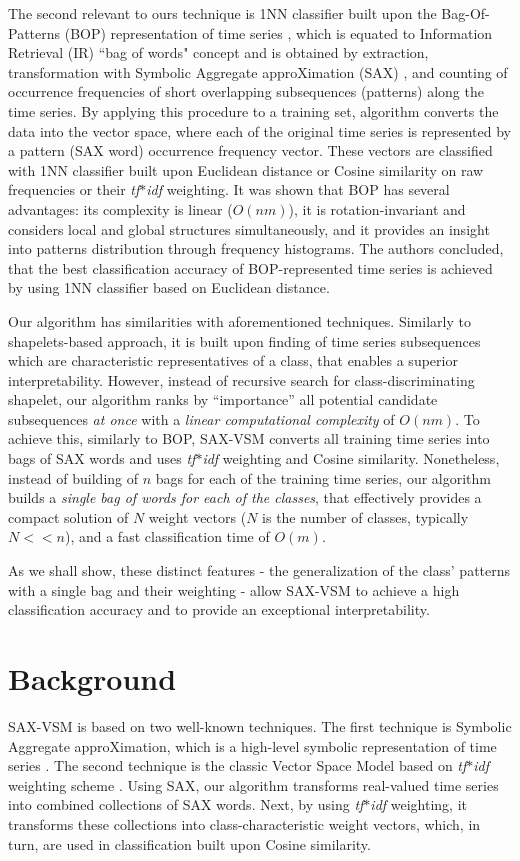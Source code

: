 \documentclass[conference]{IEEEtran}
\begin{document}
The second relevant to ours technique is 1NN classifier built upon the 
Bag-Of-Patterns (BOP) representation of time series \cite{bag_patterns}, 
which is equated to Information Retrieval (IR) ``bag of words" concept 
and is obtained by extraction, transformation with Symbolic Aggregate 
approXimation (SAX) \cite{sax}, and counting of occurrence frequencies
of short overlapping subsequences (patterns) along the time series.
By applying this procedure to a training set, algorithm converts the data into 
the vector space, where each of the original time series is represented by a 
pattern (SAX word) occurrence frequency vector. 
These vectors are classified with 1NN classifier built upon Euclidean distance 
or Cosine similarity on raw frequencies or their \textit{tf$\ast$idf} weighting. 
It was shown that BOP has several advantages: its complexity is linear 
($O(nm)$), it is rotation-invariant and considers local and global structures 
simultaneously, and it provides an insight into patterns distribution through 
frequency histograms.
The authors concluded, that the best classification accuracy of BOP-represented 
time series is achieved by using 1NN classifier based on Euclidean distance.

Our algorithm has similarities with aforementioned techniques. 
Similarly to shapelets-based approach, it is built upon finding of 
time series subsequences which are characteristic representatives 
of a class, that enables a superior interpretability.
However, instead of recursive search for class-discriminating shapelet, 
our algorithm ranks by “importance” all potential candidate subsequences 
\textit{at once} with a \textit{linear computational complexity} of $O(nm)$.
To achieve this, similarly to BOP, \mbox{SAX-VSM} converts all training 
time series into bags of SAX words and uses \textit{tf$\ast$idf} 
weighting and Cosine similarity.
Nonetheless, instead of building of $n$ bags for each of the training time series, 
our algorithm builds a \textit{single bag of words for each of the classes}, 
that effectively provides a compact solution of $N$ weight vectors 
($N$ is the number of classes, typically $N<<n$), and a fast classification time 
of $O(m)$.

As we shall show, these distinct features - the generalization of the class' 
patterns with a single bag and their weighting - allow SAX-VSM to achieve a 
high classification accuracy and to provide an exceptional interpretability.

\section{Background} \label{background}
SAX-VSM is based on two well-known techniques. The first technique is 
Symbolic Aggregate approXimation, which is a high-level symbolic
representation of time series \cite{sax}. 
The second technique is the classic Vector Space Model based on 
\textit{tf$\ast$idf} weighting scheme \cite{salton}. 
Using SAX, our algorithm transforms real-valued time series into combined 
collections of SAX words. Next, by using \textit{tf$\ast$idf} weighting, it 
transforms these collections into class-characteristic weight vectors, 
which, in turn, are used in classification built upon Cosine similarity.
\end{document}
